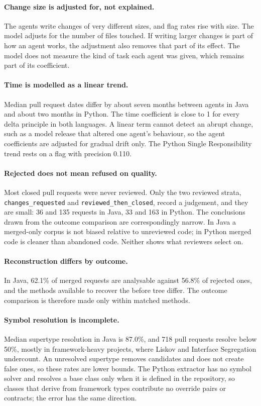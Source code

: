 \paragraph{Change size is adjusted for, not explained.} The agents write changes of very different
sizes, and flag rates rise with size. The model adjusts for the number of files touched. If writing
larger changes is part of how an agent works, the adjustment also removes that part of its effect.
The model does not measure the kind of task each agent was given, which remains part of its
coefficient.

\paragraph{Time is modelled as a linear trend.} Median pull request dates differ by about seven months
between agents in Java and about two months in Python. The time coefficient is close to 1 for every
delta principle in both languages. A linear term cannot detect an abrupt change, such as a model
release that altered one agent's behaviour, so the agent coefficients are adjusted for gradual drift
only. The Python Single Responsibility trend rests on a flag with precision 0.110.

\begin{sloppypar}
\paragraph{Rejected does not mean refused on quality.} Most closed pull requests were never reviewed.
Only the two reviewed strata, \texttt{changes\_requested} and \texttt{reviewed\_then\_closed}, record a
judgement, and they are small: 36 and 135 requests in Java, 33 and 163 in Python. The conclusions
drawn from the outcome comparison are correspondingly narrow. In Java a merged-only corpus is not
biased relative to unreviewed code; in Python merged code is cleaner than abandoned code. Neither
shows what reviewers select on.
\end{sloppypar}

\paragraph{Reconstruction differs by outcome.} In Java, 62.1\% of merged requests are analysable
against 56.8\% of rejected ones, and the methods available to recover the before tree differ. The
outcome comparison is therefore made only within matched methods.

\paragraph{Symbol resolution is incomplete.} Median supertype resolution in Java is 87.0\%, and 718
pull requests resolve below 50\%, mostly in framework-heavy projects, where Liskov and Interface
Segregation undercount. An unresolved supertype removes candidates and does not create false ones,
so these rates are lower bounds. The Python extractor has no symbol solver and resolves a base class
only when it is defined in the repository, so classes that derive from framework types contribute no
override pairs or contracts; the error has the same direction.


